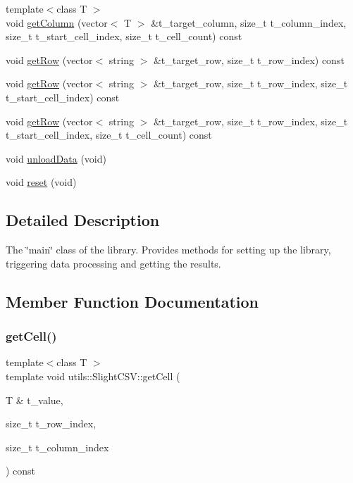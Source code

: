 \begin{DoxyCompactItemize}
\item 
{\footnotesize template$<$class T $>$ }\\void \hyperlink{classutils_1_1SlightCSV_a153cbb5059533c2103ec7ade57e4e414}{get\+Column} (vector$<$ T $>$ \&t\+\_\+target\+\_\+column, size\+\_\+t t\+\_\+column\+\_\+index, size\+\_\+t t\+\_\+start\+\_\+cell\+\_\+index, size\+\_\+t t\+\_\+cell\+\_\+count) const
\item 
void \hyperlink{classutils_1_1SlightCSV_ad4b0243488827303cd22d5efd41d96b6}{get\+Row} (vector$<$ string $>$ \&t\+\_\+target\+\_\+row, size\+\_\+t t\+\_\+row\+\_\+index) const
\item 
void \hyperlink{classutils_1_1SlightCSV_ad57a5c42bc8de6afa3d4324e52f20e2c}{get\+Row} (vector$<$ string $>$ \&t\+\_\+target\+\_\+row, size\+\_\+t t\+\_\+row\+\_\+index, size\+\_\+t t\+\_\+start\+\_\+cell\+\_\+index) const
\item 
void \hyperlink{classutils_1_1SlightCSV_a7527573dea0d6e5dc5dcfd4eab005a2b}{get\+Row} (vector$<$ string $>$ \&t\+\_\+target\+\_\+row, size\+\_\+t t\+\_\+row\+\_\+index, size\+\_\+t t\+\_\+start\+\_\+cell\+\_\+index, size\+\_\+t t\+\_\+cell\+\_\+count) const
\item 
void \hyperlink{classutils_1_1SlightCSV_aaa9c8042d6231660cb08ada7c1a8dccb}{unload\+Data} (void)
\item 
void \hyperlink{classutils_1_1SlightCSV_abc28f1e33cc67dd5d4380254070ecf97}{reset} (void)
\end{DoxyCompactItemize}


\subsection{Detailed Description}
The \char`\"{}main\char`\"{} class of the library. Provides methods for setting up the library, triggering data processing and getting the results. 

\subsection{Member Function Documentation}
\mbox{\label{classutils_1_1SlightCSV_a916d9b0b7faedc7c9af20e475c4b4cb6}} 
\subsubsection{\texorpdfstring{get\+Cell()}{getCell()}}
{\footnotesize\ttfamily template$<$class T $>$ \\
template void utils\+::\+Slight\+C\+S\+V\+::get\+Cell (\begin{DoxyParamCaption}\item[{T \&}]{t\+\_\+value,  }\item[{size\+\_\+t}]{t\+\_\+row\+\_\+index,  }\item[{size\+\_\+t}]{t\+\_\+column\+\_\+index }\end{DoxyParamCaption}) const}

